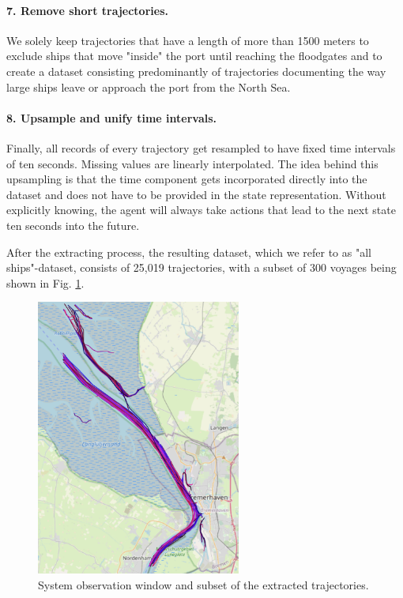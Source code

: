 \paragraph{7. Remove short trajectories.}
We solely keep trajectories that have a length of more than 1500 meters to  exclude ships that move "inside" the port until reaching the floodgates and to create a dataset consisting predominantly of trajectories documenting the way large ships leave or approach the port from the North Sea.

\paragraph{8. Upsample and unify time intervals.}
Finally, all records of every trajectory get resampled to have fixed time intervals of ten seconds. Missing values are linearly interpolated. The idea behind this upsampling is that the time component gets incorporated directly into the dataset and does not have to be provided in the state representation. Without explicitly knowing, the agent will always take actions that lead to the next state ten seconds into the future.
\par

After the extracting process, the resulting dataset, which we refer to as "all ships"-dataset, consists of 25,019 trajectories, with a subset of 300 voyages being shown in Fig. \ref{fig:tracks}.

\begin{figure}[H]
    \centering
    \includegraphics[width=0.6\textwidth]{images/ais/tracks/all_ships.png}
    \caption{System observation window and subset of the extracted trajectories.}
    \label{fig:tracks}
\end{figure}